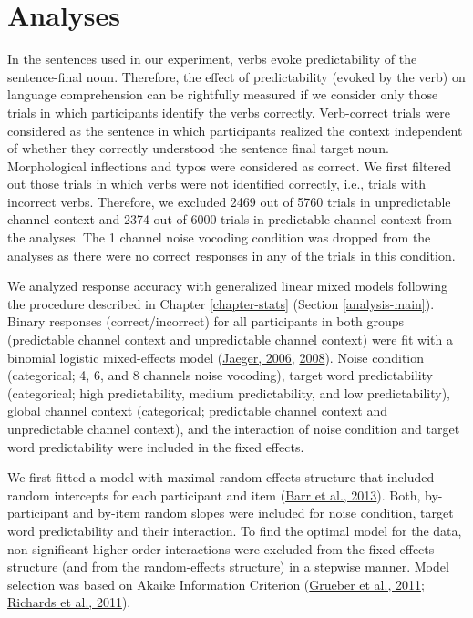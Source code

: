 \documentclass[a4paper, nobind]{templates/ociamthesis}
\begin{document}
\hypertarget{analyses-2}{%
\section{Analyses}\label{analyses-2}}

In the sentences used in our experiment, verbs evoke predictability of the sentence-final noun.
Therefore, the effect of predictability (evoked by the verb) on language comprehension can be rightfully measured if we consider only those trials in which participants identify the verbs correctly.
Verb-correct trials were considered as the sentence in which participants realized the context independent of whether they correctly understood the sentence final target noun.
Morphological inflections and typos were considered as correct.
We first filtered out those trials in which verbs were not identified correctly, i.e., trials with incorrect verbs.
Therefore, we excluded 2469 out of 5760 trials in unpredictable channel context and 2374 out of 6000 trials in predictable channel context from the analyses.
The 1 channel noise vocoding condition was dropped from the analyses as there were no correct responses in any of the trials in this condition.

We analyzed response accuracy with generalized linear mixed models following the procedure described in Chapter \ref{chapter-stats} (Section \ref{analysis-main}).
Binary responses (correct/incorrect) for all participants in both groups (predictable channel context and unpredictable channel context) were fit with a binomial logistic mixed-effects model (\protect\hyperlink{ref-Jaeger2006}{Jaeger, 2006}, \protect\hyperlink{ref-Jaeger2008}{2008}).
Noise condition (categorical; 4, 6, and 8 channels noise vocoding), target word predictability (categorical; high predictability, medium predictability, and low predictability), global channel context (categorical; predictable channel context and unpredictable channel context), and the interaction of noise condition and target word predictability were included in the fixed effects.

We first fitted a model with maximal random effects structure that included random intercepts for each participant and item (\protect\hyperlink{ref-Barr2013}{Barr et al., 2013}).
Both, by-participant and by-item random slopes were included for noise condition, target word predictability and their interaction.
To find the optimal model for the data, non-significant higher-order interactions were excluded from the fixed-effects structure (and from the random-effects structure) in a stepwise manner.
Model selection was based on Akaike Information Criterion (\protect\hyperlink{ref-Grueber2011}{Grueber et al., 2011}; \protect\hyperlink{ref-Richards2011}{Richards et al., 2011}).
\end{document}
